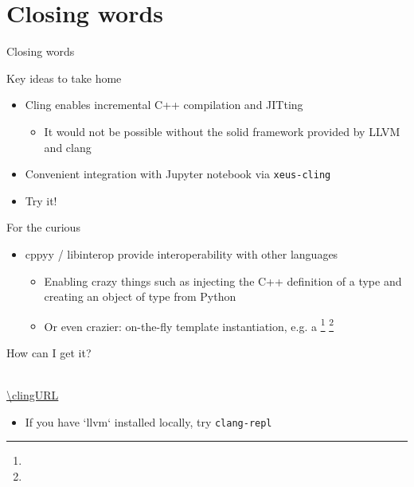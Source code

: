 \section{Closing words}

\begin{frame}{Closing words}
  \begin{block}{Key ideas to take home}
    \begin{itemize}
    \item Cling enables incremental C++ compilation and JITting
      \begin{itemize}
      \item It would not be possible without the solid framework provided by LLVM and clang
      \end{itemize}

    \item Convenient integration with Jupyter notebook via \texttt{xeus-cling}
    \item Try it!
    \end{itemize}
  \end{block}
  \vfill
  \begin{block}{For the curious}
    \begin{itemize}
    \item cppyy / libinterop provide interoperability with other languages
      \begin{itemize}
      \item Enabling crazy things such as injecting the C++ definition of a type  and creating an object of type  from Python

      \item Or even crazier: on-the-fly template instantiation, e.g. a %
        \footnote{\cppyyURL}%
        \footnote{\libinteropURL}
      \end{itemize}
    \end{itemize}
  \end{block}
\end{frame}

\begin{frame}{How can I get it?}
  \begin{center}
    \qrcode[height=1in]{\clingURL}\\[1ex]
    \url{\clingURL}
  \end{center}

  \begin{itemize}
  \item If you have `llvm` installed locally, try \texttt{clang-repl}
  \end{itemize}
\end{frame}
